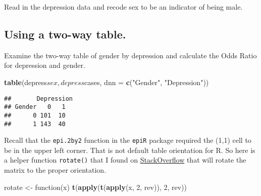 \documentclass[]{article}
\newenvironment{Shaded}{\begin{snugshade}}{\end{snugshade}}
\newcommand{\KeywordTok}[1]{\textcolor[rgb]{0.13,0.29,0.53}{\textbf{{#1}}}}
\newcommand{\DataTypeTok}[1]{\textcolor[rgb]{0.13,0.29,0.53}{{#1}}}
\newcommand{\DecValTok}[1]{\textcolor[rgb]{0.00,0.00,0.81}{{#1}}}
\newcommand{\StringTok}[1]{\textcolor[rgb]{0.31,0.60,0.02}{{#1}}}
\newcommand{\CommentTok}[1]{\textcolor[rgb]{0.56,0.35,0.01}{\textit{{#1}}}}
\newcommand{\NormalTok}[1]{{#1}}
\begin{document}
Read in the depression data and recode sex to be an indicator of being
male.

\begin{Shaded}
\end{Shaded}

\subsection{Using a two-way table.}\label{using-a-two-way-table.}

Examine the two-way table of gender by depression and calculate the Odds
Ratio for depression and gender.

\begin{Shaded}
\begin{Highlighting}[]
\KeywordTok{table}\NormalTok{(depress$sex, depress$cases, }\DataTypeTok{dnn =} \KeywordTok{c}\NormalTok{(}\StringTok{"Gender"}\NormalTok{, }\StringTok{"Depression"}\NormalTok{))}
\end{Highlighting}
\end{Shaded}

\begin{verbatim}
##       Depression
## Gender   0   1
##      0 101  10
##      1 143  40
\end{verbatim}

Recall that the \texttt{epi.2by2} function in the \texttt{epiR} package
required the (1,1) cell to be in the upper left corner. That is not
default table orientation for R. So here is a helper function
\texttt{rotate()} that I found on
\href{http://stackoverflow.com/questions/16496210/rotate-a-matrix-in-r}{StackOverflow}
that will rotate the matrix to the proper orientation.

\begin{Shaded}
\begin{Highlighting}[]
\NormalTok{rotate <-}\StringTok{ }\NormalTok{function(x) }\KeywordTok{t}\NormalTok{(}\KeywordTok{apply}\NormalTok{(}\KeywordTok{t}\NormalTok{(}\KeywordTok{apply}\NormalTok{(x, }\DecValTok{2}\NormalTok{, rev)), }\DecValTok{2}\NormalTok{, rev))}
\end{Highlighting}
\end{Shaded}
\end{document}
